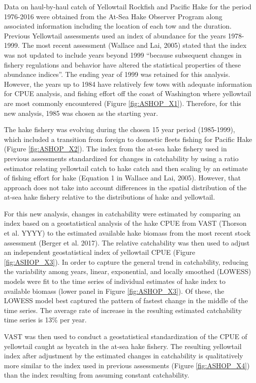 \documentclass[12pt,]{article}
\begin{document}
Data on haul-by-haul catch of Yellowtail Rockfish and Pacific Hake for
the period 1976-2016 were obtained from the At-Sea Hake Observer Program
along associated information including the location of each tow and the
duration. Previous Yellowtail assessments used an index of abundance for
the years 1978-1999. The most recent assessment (Wallace and Lai, 2005)
stated that the index was not updated to include years beyond 1999
``because subsequent changes in fishery regulations and behavior have
altered the statistical properties of these abundance indices''. The
ending year of 1999 was retained for this analysis. However, the years
up to 1984 have relatively few tows with adequate information for CPUE
analysis, and fishing effort off the coast of Washington where
yellowtail are most commonly encountered (Figure \ref{fig:ASHOP_X1}).
Therefore, for this new analysis, 1985 was chosen as the starting year.

The hake fishery was evolving during the chosen 15 year period
(1985-1999), which included a transition from foreign to domestic fleets
fishing for Pacific Hake (Figure \ref{fig:ASHOP_X2}). The index from the
at-sea hake fishery used in previous assessments standardized for
changes in catchability by using a ratio estimator relating yellowtail
catch to hake catch and then scaling by an estimate of fishing effort
for hake (Equation 1 in Wallace and Lai, 2005). However, that approach
does not take into account differences in the spatial distribution of
the at-sea hake fishery relative to the distributions of hake and
yellowtail.

For this new analysis, changes in catchability were estimated by
comparing an index based on a geostatistical analysis of the hake CPUE
from VAST (Thorson et al. YYYY) to the estimated available hake biomass
from the most recent stock assessment (Berger et al. 2017). The relative
catchability was then used to adjust an independent geostatistical index
of yellowtail CPUE (Figure \ref{fig:ASHOP_X3}). In order to capture the
general trend in catchability, reducing the variability among years,
linear, exponential, and locally smoothed (LOWESS) models were fit to
the time series of individual estimates of hake index to available
biomass (lower panel in Figure \ref{fig:ASHOP_X3}). Of these, the LOWESS
model best captured the pattern of fastest change in the middle of the
time series. The average rate of increase in the resulting estimated
catchability time series is 13\% per year.

VAST was then used to conduct a geostatistical standardization of the
CPUE of yellowtail caught as bycatch in the at-sea hake fishery. The
resulting yellowtail index after adjustment by the estimated changes in
catchability is qualitatively more similar to the index used in previous
assessments (Figure \ref{fig:ASHOP_X4}) than the index resulting from
assuming constant catchability.
\end{document}
